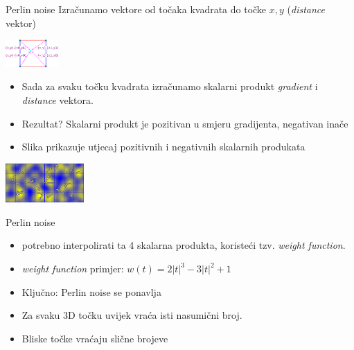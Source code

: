 \documentclass[9pt]{beamer}
\begin{document}
\begin{frame}{Perlin noise}
	Izračunamo vektore od točaka kvadrata do točke $x, y$ (\textit{distance} vektor)
	\begin{center}
		\includegraphics[width=2cm]{slike/logic03.png}
	\end{center}
	\begin{itemize}
		\item Sada za svaku točku kvadrata izračunamo skalarni produkt \textit{gradient} i \textit{distance} vektora.
		\item Rezultat? Skalarni produkt je pozitivan u smjeru gradijenta, negativan inače
		\item Slika prikazuje utjecaj pozitivnih i negativnih skalarnih produkata
	\end{itemize}
	\begin{center}
		\includegraphics[width=3cm]{slike/logic04.png}
	\end{center}
\end{frame}

\begin{frame}{Perlin noise}
	\begin{itemize}
		\item potrebno interpolirati ta 4 skalarna produkta, koristeći tzv. \textit{weight function}.
		\item \textit{weight function} primjer: $w(t) = 2|t|^3 - 3|t|^2 + 1$
	\end{itemize}
	
	\begin{itemize}
		\item Ključno: Perlin noise se ponavlja
		\item Za svaku 3D točku uvijek vraća isti nasumični broj.
		\item Bliske točke vraćaju slične brojeve
	\end{itemize}
\end{frame}
\end{document}
